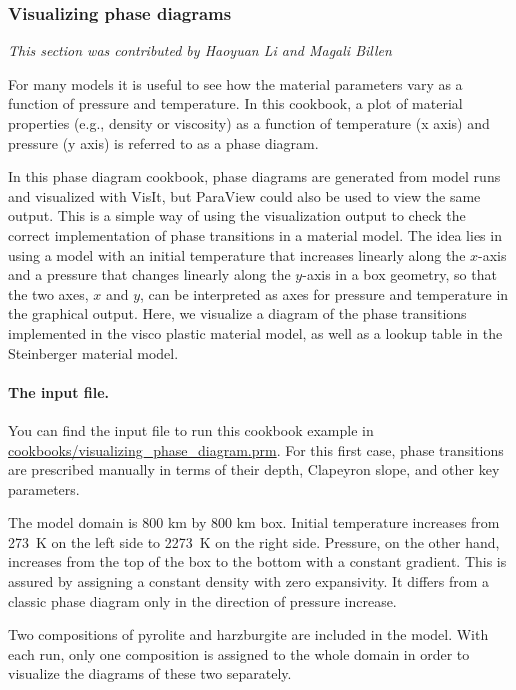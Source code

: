 \subsubsection{Visualizing phase diagrams}
\label{sec:visualizing-phase-diagram}
\textit{This section was contributed by Haoyuan Li and Magali Billen}

For many models it is useful to see how the material parameters vary as a function of pressure and temperature. In this cookbook, a plot of material properties (e.g., density or viscosity) as a function of temperature (x axis) and pressure (y axis) is referred to as a phase diagram. 

In this phase diagram cookbook, phase diagrams are generated from model runs and visualized with VisIt, but ParaView could also be used to view the same output. %
This is a simple way of using the visualization output to check the correct implementation of phase transitions in a material model. 
The idea lies in using a model with an initial temperature that increases linearly along the $x$-axis and a pressure that changes linearly along the $y$-axis in a box geometry, so that the two axes, $x$ and $y$, can be interpreted as axes for pressure and temperature in the graphical output. 
Here, we visualize a diagram of the phase transitions implemented in the visco plastic material model, as well as a lookup table in the Steinberger material model. 

\paragraph{The input file.}
You can find the input file to run this cookbook example in \url{cookbooks/visualizing_phase_diagram.prm}. For this first case, phase transitions are prescribed manually in terms of their depth, Clapeyron slope, and other key parameters. 

The model domain is  800 km  by 800 km box. %
Initial temperature increases from \SI{273}{K} on the left side to \SI{2273}{K} on the right side. %
Pressure, on the other hand, increases from the top of the box to the bottom with a constant gradient.
This is assured by assigning a constant density with zero expansivity.
It differs from a classic phase diagram only in the direction of pressure increase.

\par Two compositions of pyrolite and harzburgite are included in the model. %
With each run, only one composition is assigned to the whole domain in order to visualize the diagrams of these two separately.

